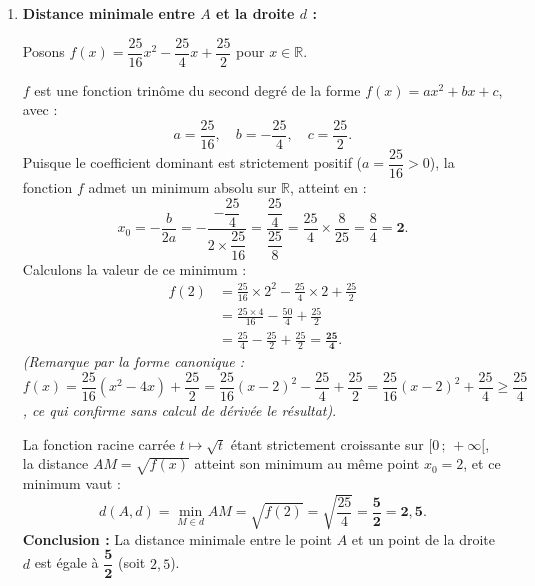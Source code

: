 \documentclass[11pt,a4paper]{article}
\newcommand{\R}{\mathbb{R}}
\begin{document}
\begin{correctionbox}
\begin{enumerate}
    \item \textbf{Distance minimale entre $A$ et la droite $d$ :}
    
    Posons $f(x) = \dfrac{25}{16}x^2 - \dfrac{25}{4}x + \dfrac{25}{2}$ pour $x \in \R$.
    
    $f$ est une fonction trinôme du second degré de la forme $f(x) = ax^2 + bx + c$, avec :
    \[
    a = \frac{25}{16}, \quad b = -\frac{25}{4}, \quad c = \frac{25}{2}.
    \]
    Puisque le coefficient dominant est strictement positif ($a = \dfrac{25}{16} > 0$), la fonction $f$ admet un minimum absolu sur $\R$, atteint en :
    \[
    x_0 = -\frac{b}{2a} = -\frac{-\dfrac{25}{4}}{2 \times \dfrac{25}{16}} = \frac{\dfrac{25}{4}}{\dfrac{25}{8}} = \frac{25}{4} \times \frac{8}{25} = \frac{8}{4} = \mathbf{2}.
    \]
    Calculons la valeur de ce minimum :
    \begin{align*}
    f(2) &= \frac{25}{16} \times 2^2 - \frac{25}{4} \times 2 + \frac{25}{2} \\
    &= \frac{25 \times 4}{16} - \frac{50}{4} + \frac{25}{2} \\
    &= \frac{25}{4} - \frac{25}{2} + \frac{25}{2} = \mathbf{\frac{25}{4}}.
    \end{align*}
    \textit{(Remarque par la forme canonique : $f(x) = \dfrac{25}{16}(x^2 - 4x) + \dfrac{25}{2} = \dfrac{25}{16}(x - 2)^2 - \dfrac{25}{4} + \dfrac{25}{2} = \dfrac{25}{16}(x - 2)^2 + \dfrac{25}{4} \ge \dfrac{25}{4}$, ce qui confirme sans calcul de dérivée le résultat)}.
    
    La fonction racine carrée $t \mapsto \sqrt{t}$ étant strictement croissante sur $[0\,;\, +\infty[$, la distance $AM = \sqrt{f(x)}$ atteint son minimum au même point $x_0 = 2$, et ce minimum vaut :
    \[
    d(A, d) = \min_{M \in d} AM = \sqrt{f(2)} = \sqrt{\frac{25}{4}} = \mathbf{\frac{5}{2} = 2{,}5}.
    \]
    \textbf{Conclusion :} La distance minimale entre le point $A$ et un point de la droite $d$ est égale à $\mathbf{\dfrac{5}{2}}$ (soit $2{,}5$).
\end{enumerate}
\end{correctionbox}
\end{document}
